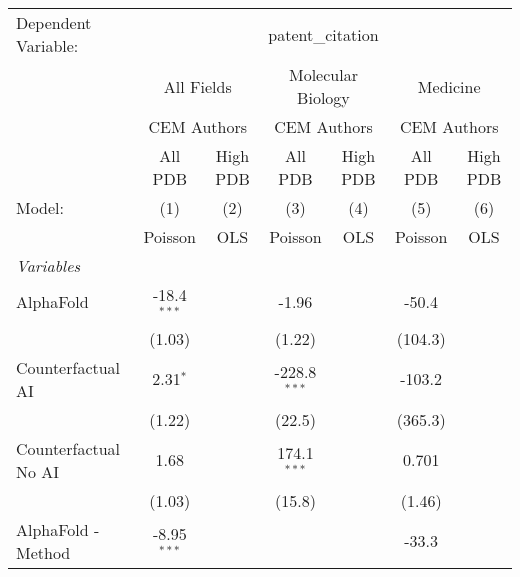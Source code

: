 \begingroup
\centering
\begin{tabular}{lcccccc}
   \tabularnewline \midrule \midrule
   Dependent Variable: & \multicolumn{6}{c}{patent\_citation}\\
 & \multicolumn{2}{c}{All Fields} & \multicolumn{2}{c}{Molecular Biology} & \multicolumn{2}{c}{Medicine} \\
\cmidrule(lr){2-3} \cmidrule(lr){4-5} \cmidrule(lr){6-7}
 & \multicolumn{2}{c}{CEM Authors} & \multicolumn{2}{c}{CEM Authors} & \multicolumn{2}{c}{CEM Authors} \\
\cmidrule(lr){2-3} \cmidrule(lr){4-5} \cmidrule(lr){6-7}
 & \multicolumn{1}{c}{All PDB} & \multicolumn{1}{c}{High PDB} & \multicolumn{1}{c}{All PDB} & \multicolumn{1}{c}{High PDB} & \multicolumn{1}{c}{All PDB} & \multicolumn{1}{c}{High PDB} \\
\cmidrule(lr){2-2} \cmidrule(lr){3-3} \cmidrule(lr){4-4} \cmidrule(lr){5-5} \cmidrule(lr){6-6} \cmidrule(lr){7-7}
   Model:                                                     & (1)           & (2)  & (3)            & (4)  & (5)          & (6)\\  
                                                              &  Poisson      & OLS  & Poisson        & OLS  & Poisson      & OLS\\  
   \midrule
   \emph{Variables}\\
   AlphaFold                                                  & -18.4$^{***}$ &      & -1.96          &      & -50.4        &   \\   
                                                              & (1.03)        &      & (1.22)         &      & (104.3)      &   \\   
   Counterfactual AI                                          & 2.31$^{*}$    &      & -228.8$^{***}$ &      & -103.2       &   \\   
                                                              & (1.22)        &      & (22.5)         &      & (365.3)      &   \\   
   Counterfactual No AI                                       & 1.68          &      & 174.1$^{***}$  &      & 0.701        &   \\   
                                                              & (1.03)        &      & (15.8)         &      & (1.46)       &   \\   
   AlphaFold - Method                                         & -8.95$^{***}$ &      &                &      & -33.3        &   \\   

\end{tabular}
